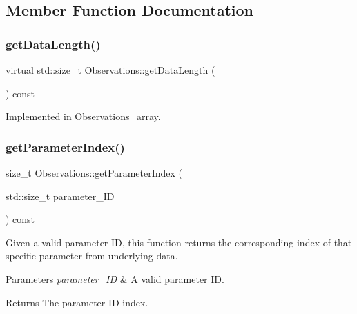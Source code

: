 \subsection{Member Function Documentation}
\mbox{\label{class_observations_a3ad688dc4ef6dc6adabe212808fd32a9}} 
\subsubsection{\texorpdfstring{get\+Data\+Length()}{getDataLength()}}
{\footnotesize\ttfamily virtual std\+::size\+\_\+t Observations\+::get\+Data\+Length (\begin{DoxyParamCaption}{ }\end{DoxyParamCaption}) const\hspace{0.3cm}{\ttfamily [pure virtual]}}



Implemented in \mbox{\hyperlink{class_observations__array_ae535b742be4ea895117da607fbe7c702}{Observations\+\_\+array}}.

\mbox{\label{class_observations_a73897578d7e1d4aaf6023857db896ee8}} 
\subsubsection{\texorpdfstring{get\+Parameter\+Index()}{getParameterIndex()}}
{\footnotesize\ttfamily size\+\_\+t Observations\+::get\+Parameter\+Index (\begin{DoxyParamCaption}\item[{std\+::size\+\_\+t}]{parameter\+\_\+\+ID }\end{DoxyParamCaption}) const}

Given a valid parameter ID, this function returns the corresponding index of that specific parameter from underlying data.


\begin{DoxyParams}{Parameters}
{\em parameter\+\_\+\+ID} & A valid parameter ID. \\
\hline
\end{DoxyParams}
\begin{DoxyReturn}{Returns}
The parameter ID index. 
\end{DoxyReturn}
\mbox{\label{class_observations_a5347196195a72495217dc0614c9224c2}} 
